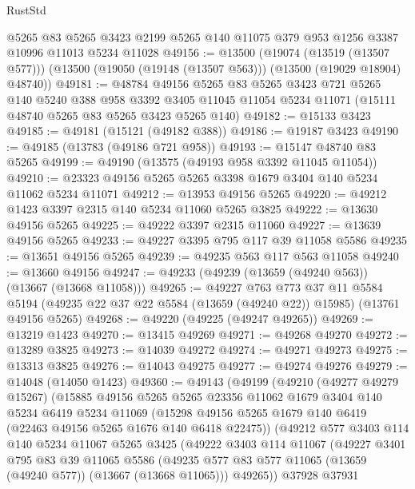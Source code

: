 \begin{lexlean}{RustStd}
\begin{coremodule}
    @5265
    @83
    @5265
    @3423
    @2199
    @5265
    @140
    @11075
    @379
    @953
    @1256
    @3387
    @10996
    @11013
    @5234
    @11028
@49156 := @13500
    (@19074 (@13519 (@13507 @577)))
    (@13500 (@19050 (@19148 (@13507 @563))) (@13500 (@19029 @18904) @48740))
@49181 := @48784
    @49156
    @5265
    @83
    @5265
    @3423
    @721
    @5265
    @140
    @5240
    @388
    @958
    @3392
    @3405
    @11045
    @11054
    @5234
    @11071
    (@15111 @48740 @5265 @83 @5265 @3423 @5265 @140)
@49182 := @15133 @3423
@49185 := @49181 (@15121 (@49182 @388))
@49186 := @19187 @3423
@49190 := @49185 (@13783 (@49186 @721 @958))
@49193 := @15147 @48740 @83 @5265
@49199 := @49190 (@13575 (@49193 @958 @3392 @11045 @11054))
@49210 := @23323 @49156 @5265 @5265 @3398 @1679 @3404 @140 @5234 @11062 @5234 @11071
@49212 := @13953 @49156 @5265
@49220 := @49212 @1423 @3397 @2315 @140 @5234 @11060 @5265 @3825
@49222 := @13630 @49156 @5265
@49225 := @49222 @3397 @2315 @11060
@49227 := @13639 @49156 @5265
@49233 := @49227 @3395 @795 @117 @39 @11058 @5586
@49235 := @13651 @49156 @5265
@49239 := @49235 @563 @117 @563 @11058
@49240 := @13660 @49156
@49247 := @49233 (@49239 (@13659 (@49240 @563)) (@13667 (@13668 @11058)))
@49265 := @49227
    @763
    @773
    @37
    @11
    @5584
    @5194
    (@49235 @22 @37 @22 @5584 (@13659 (@49240 @22)) @15985)
    (@13761 @49156 @5265)
@49268 := @49220 (@49225 (@49247 @49265))
@49269 := @13219 @1423
@49270 := @13415 @49269
@49271 := @49268 @49270
@49272 := @13289 @3825
@49273 := @14039 @49272
@49274 := @49271 @49273
@49275 := @13313 @3825
@49276 := @14043 @49275
@49277 := @49274 @49276
@49279 := @14048 (@14050 @1423)
@49360 := @49143
    (@49199
      (@49210
        (@49277 @49279 @15267)
        (@15885
          @49156
          @5265
          @5265
          @23356
          @11062
          @1679
          @3404
          @140
          @5234
          @6419
          @5234
          @11069
          (@15298 @49156 @5265 @1679 @140 @6419 (@22463 @49156 @5265 @1676 @140 @6418 @22475))
          (@49212
            @577
            @3403
            @114
            @140
            @5234
            @11067
            @5265
            @3425
            (@49222
              @3403
              @114
              @11067
              (@49227
                @3401
                @795
                @83
                @39
                @11065
                @5586
                (@49235 @577 @83 @577 @11065 (@13659 (@49240 @577)) (@13667 (@13668 @11065)))
                @49265))
            @37928
            @37931

\end{coremodule}
\end{lexlean}
